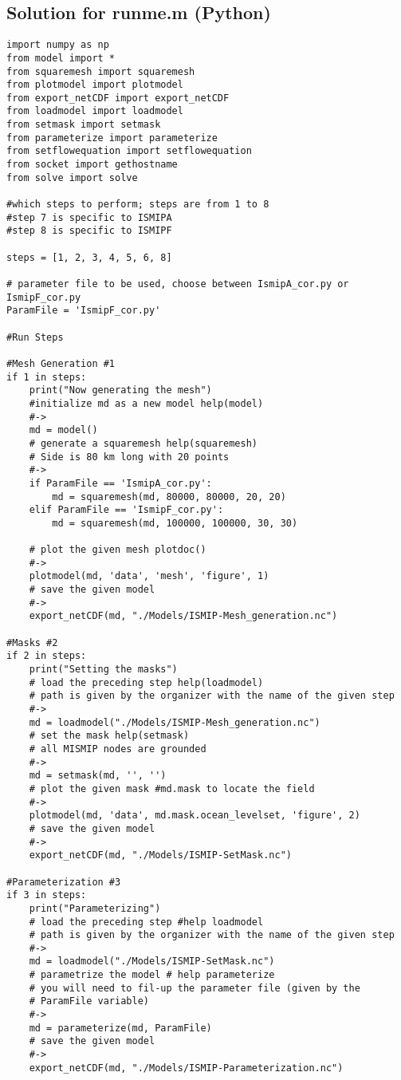 \subsection{Solution for runme.m (Python)}%
\begin{verbatim}import numpy as np
from model import *
from squaremesh import squaremesh
from plotmodel import plotmodel
from export_netCDF import export_netCDF
from loadmodel import loadmodel
from setmask import setmask
from parameterize import parameterize
from setflowequation import setflowequation
from socket import gethostname
from solve import solve

#which steps to perform; steps are from 1 to 8
#step 7 is specific to ISMIPA
#step 8 is specific to ISMIPF

steps = [1, 2, 3, 4, 5, 6, 8]

# parameter file to be used, choose between IsmipA_cor.py or IsmipF_cor.py
ParamFile = 'IsmipF_cor.py'

#Run Steps

#Mesh Generation #1
if 1 in steps:
    print("Now generating the mesh")
    #initialize md as a new model help(model)
    #->
    md = model()
    # generate a squaremesh help(squaremesh)
    # Side is 80 km long with 20 points
    #->
    if ParamFile == 'IsmipA_cor.py':
        md = squaremesh(md, 80000, 80000, 20, 20)
    elif ParamFile == 'IsmipF_cor.py':
        md = squaremesh(md, 100000, 100000, 30, 30)

    # plot the given mesh plotdoc()
    #->
    plotmodel(md, 'data', 'mesh', 'figure', 1)
    # save the given model
    #->
    export_netCDF(md, "./Models/ISMIP-Mesh_generation.nc")

#Masks #2
if 2 in steps:
    print("Setting the masks")
    # load the preceding step help(loadmodel)
    # path is given by the organizer with the name of the given step
    #->
    md = loadmodel("./Models/ISMIP-Mesh_generation.nc")
    # set the mask help(setmask)
    # all MISMIP nodes are grounded
    #->
    md = setmask(md, '', '')
    # plot the given mask #md.mask to locate the field
    #->
    plotmodel(md, 'data', md.mask.ocean_levelset, 'figure', 2)
    # save the given model
    #->
    export_netCDF(md, "./Models/ISMIP-SetMask.nc")

#Parameterization #3
if 3 in steps:
    print("Parameterizing")
    # load the preceding step #help loadmodel
    # path is given by the organizer with the name of the given step
    #->
    md = loadmodel("./Models/ISMIP-SetMask.nc")
    # parametrize the model # help parameterize
    # you will need to fil-up the parameter file (given by the
    # ParamFile variable)
    #->
    md = parameterize(md, ParamFile)
    # save the given model
    #->
    export_netCDF(md, "./Models/ISMIP-Parameterization.nc")


\end{verbatim}

